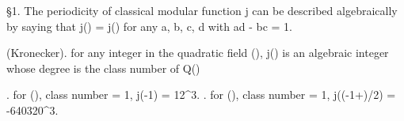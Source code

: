 
  \S 1. The periodicity of classical modular function j can be 
described algebraically by saying that j(\tau) = j() 
for any a, b, c, d \in \Z with ad - bc = 1.

\theorem (Kronecker). for any integer \tau in the quadratic field \Q(), 
j(\tau) is an algebraic integer whose degree is the class number of Q()

\example. for \Q(), class number = 1, j(-1) = 12^3.
\example. for \Q(), class number = 1, j((-1+)/2) = -640320^3.

